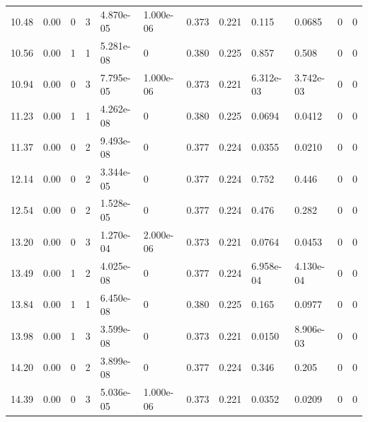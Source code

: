 \documentclass[preview]{standalone}
\begin{document}
{{\begin{tabular}{L{1.2cm}C{1.2cm} C{0.3cm}C{0.5cm} C{1.4cm}C{1.4cm} C{1.4cm}C{1.4cm} C{1.6cm}C{1.6cm} C{1.6cm}C{1.6cm}}
  10.48  &  0.00  & 0     &  3 &  4.870e-05  & 1.000e-06  &  0.373&   0.221& 0.115 & 0.0685   &  0 & 0  \\ 
  10.56  &  0.00  & 1     &  1 &  5.281e-08  & 0  &  0.380&   0.225& 0.857 & 0.508   &  0 & 0  \\ 
  10.94  &  0.00  & 0     &  3 &  7.795e-05  & 1.000e-06  &  0.373&   0.221& 6.312e-03 & 3.742e-03   &  0 & 0  \\ 
  11.23  &  0.00  & 1     &  1 &  4.262e-08  & 0  &  0.380&   0.225& 0.0694 & 0.0412   &  0 & 0  \\ 
  11.37  &  0.00  & 0     &  2 &  9.493e-08  & 0  &  0.377&   0.224& 0.0355 & 0.0210   &  0 & 0  \\ 
  12.14  &  0.00  & 0     &  2 &  3.344e-05  & 0  &  0.377&   0.224& 0.752 & 0.446   &  0 & 0  \\ 
  12.54  &  0.00  & 0     &  2 &  1.528e-05  & 0  &  0.377&   0.224& 0.476 & 0.282   &  0 & 0  \\ 
  13.20  &  0.00  & 0     &  3 &  1.270e-04  & 2.000e-06  &  0.373&   0.221& 0.0764 & 0.0453   &  0 & 0  \\ 
  13.49  &  0.00  & 1     &  2 &  4.025e-08  & 0  &  0.377&   0.224& 6.958e-04 & 4.130e-04   &  0 & 0  \\ 
  13.84  &  0.00  & 1     &  1 &  6.450e-08  & 0  &  0.380&   0.225& 0.165 & 0.0977   &  0 & 0  \\ 
  13.98  &  0.00  & 1     &  3 &  3.599e-08  & 0  &  0.373&   0.221& 0.0150 & 8.906e-03   &  0 & 0  \\ 
  14.20  &  0.00  & 0     &  2 &  3.899e-08  & 0  &  0.377&   0.224& 0.346 & 0.205   &  0 & 0  \\ 
  14.39  &  0.00  & 0     &  3 &  5.036e-05  & 1.000e-06  &  0.373&   0.221& 0.0352 & 0.0209   &  0 & 0  \\ 
\hline 
\end{tabular} 

}}
\end{document}
